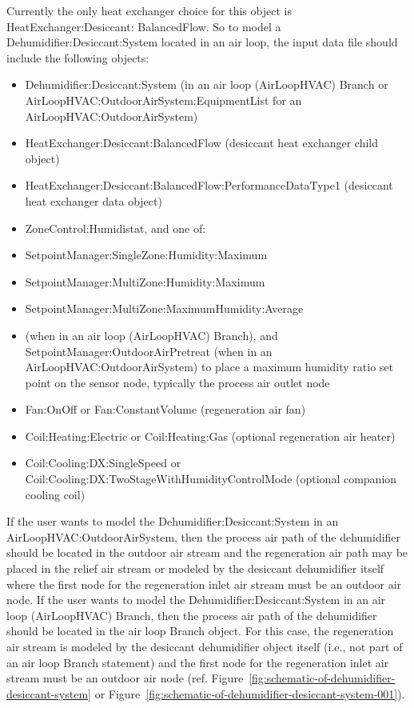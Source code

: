 Currently the only heat exchanger choice for this object is HeatExchanger:Desiccant: BalancedFlow. So to model a Dehumidifier:Desiccant:System located in an air loop, the input data file should include the following objects:

\begin{itemize}
\item
  Dehumidifier:Desiccant:System (in an air loop (AirLoopHVAC) Branch or AirLoopHVAC:OutdoorAirSystem:EquipmentList for an AirLoopHVAC:OutdoorAirSystem)
\item
  HeatExchanger:Desiccant:BalancedFlow (desiccant heat exchanger child object)
\item
  HeatExchanger:Desiccant:BalancedFlow:PerformanceDataType1 (desiccant heat exchanger data object)
\item
  ZoneControl:Humidistat, and one of:
\item
  SetpointManager:SingleZone:Humidity:Maximum
\item
  SetpointManager:MultiZone:Humidity:Maximum
\item
  SetpointManager:MultiZone:MaximumHumidity:Average
\item
  (when in an air loop (AirLoopHVAC) Branch), and SetpointManager:OutdoorAirPretreat (when in an AirLoopHVAC:OutdoorAirSystem) to place a maximum humidity ratio set point on the sensor node, typically the process air outlet node
\item
  Fan:OnOff or Fan:ConstantVolume (regeneration air fan)
\item
  Coil:Heating:Electric or Coil:Heating:Gas (optional regeneration air heater)
\item
  Coil:Cooling:DX:SingleSpeed or Coil:Cooling:DX:TwoStageWithHumidityControlMode (optional companion cooling coil)
\end{itemize}

If the user wants to model the Dehumidifier:Desiccant:System in an AirLoopHVAC:OutdoorAirSystem, then the process air path of the dehumidifier should be located in the outdoor air stream and the regeneration air path may be placed in the relief air stream or modeled by the desiccant dehumidifier itself where the first node for the regeneration inlet air stream must be an outdoor air node. If the user wants to model the Dehumidifier:Desiccant:System in an air loop (AirLoopHVAC) Branch, then the process air path of the dehumidifier should be located in the air loop Branch object. For this case, the regeneration air stream is modeled by the desiccant dehumidifier object itself (i.e., not part of an air loop Branch statement) and the first node for the regeneration inlet air stream must be an outdoor air node (ref. Figure~\ref{fig:schematic-of-dehumidifier-desiccant-system} or Figure~\ref{fig:schematic-of-dehumidifier-desiccant-system-001}).

